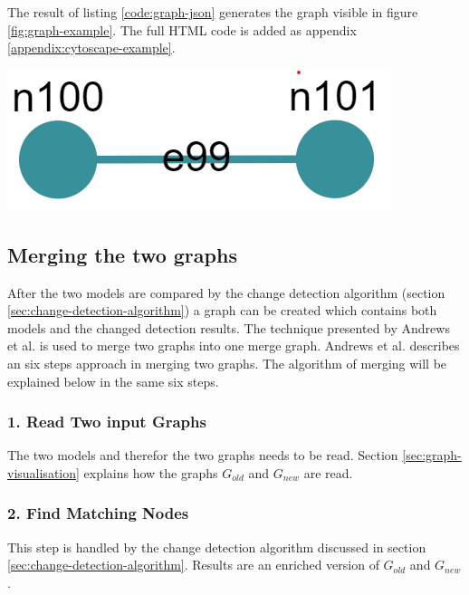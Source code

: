 The result of listing \ref{code:graph-json} generates the graph visible in figure \ref{fig:graph-example}. The full HTML code is added as appendix \ref{appendix:cytoscape-example}. 

\begingroup
\captionsetup{type=figure}
\includegraphics[scale=0.6]{content/5-Results/Images/graph-example.png}
\label{fig:graph-example}
\endgroup

\subsection{Merging the two graphs} \label{sec:merge-graph}

After the two models are compared by the change detection algorithm (section \ref{sec:change-detection-algorithm}) a graph can be created which contains both models and the changed detection results. The technique presented by Andrews et al. is used to merge two graphs into one merge graph. Andrews et al. describes an six steps approach in merging two graphs. The algorithm of merging will be explained below in the same six steps.

\subsubsection{1. Read Two input Graphs}

The two models and therefor the two graphs needs to be read. Section \ref{sec:graph-visualisation} explains how the graphs $G_{old}$ and $G_{new}$ are read.

\subsubsection{2. Find Matching Nodes}
This step is handled by the change detection algorithm discussed in section \ref{sec:change-detection-algorithm}.
Results are an enriched version of $G_{old}$ and $G_{new}$. 


